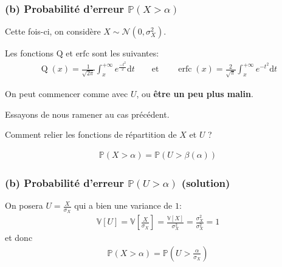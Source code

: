 \documentclass[11pt]{article}
\begin{document}
    \hypertarget{b-probabilituxe9-derreur-mathbbpx-alpha}{%
\subsubsection{\texorpdfstring{(b) Probabilité d'erreur
\(\mathbb{P}(X > \alpha)\)}{(b) Probabilité d'erreur \textbackslash mathbb\{P\}(X \textgreater{} \textbackslash alpha)}}\label{b-probabilituxe9-derreur-mathbbpx-alpha}}

Cette fois-ci, on considère \(X\sim\mathcal{N}(0,\sigma_X^2)\).

Les fonctions \(\mathrm{Q}\) et \(\mathrm{erfc}\) sont les suivantes:
\begin{align}
    \operatorname{Q}(x) = \frac{1}{\sqrt{2 \pi}} \int_{x}^{+\infty} e^{\frac{-t^{2}}{2}} \mathrm{d} t \qquad\text{et}\qquad
    \operatorname{erfc}(x)=\frac{2}{\sqrt{\pi}} \int_{x}^{+\infty} e^{-t^{2}} \mathrm{d} t
\end{align}

On peut commencer comme avec \(U\), ou \textbf{être un peu plus malin}.

Essayons de nous ramener au cas précédent.

Comment relier les fonctions de répartition de \(X\) et \(U\) ?

\begin{align}
    \mathbb{P}(X > \alpha) = \mathbb{P}(U > \beta(\alpha))
\end{align}

    \hypertarget{b-probabilituxe9-derreur-mathbbpu-alpha-solution}{%
\subsubsection{\texorpdfstring{(b) Probabilité d'erreur
\(\mathbb{P}(U > \alpha)\)
(solution)}{(b) Probabilité d'erreur \textbackslash mathbb\{P\}(U \textgreater{} \textbackslash alpha) (solution)}}\label{b-probabilituxe9-derreur-mathbbpu-alpha-solution}}

On posera \(U = \frac{X}{\sigma_X}\) qui a bien une variance de \(1\):
\begin{align}
    \mathbb{V}[U] = \mathbb{V}\left[\frac{X}{\sigma_X}\right] = \frac{\mathbb{V}[X]}{\sigma_X^2} = \frac{\sigma_X^2}{\sigma_X^2} = 1
\end{align} et donc \begin{align}
    \mathbb{P}(X > \alpha) = \mathbb{P}\left(U > \frac{\alpha}{\sigma_X}\right)
\end{align}
\end{document}
